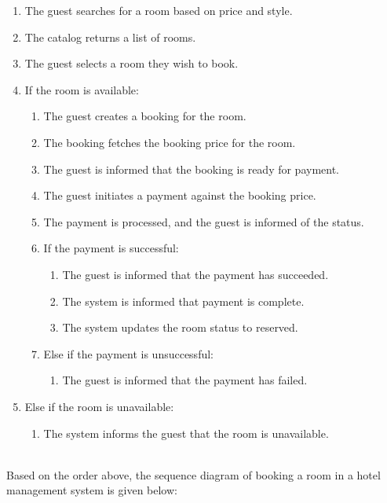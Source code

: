 \begin{enumerate}
\item
\protect{}\label{_birp3wlA1zLx5mtHHKYA}
The guest searches for a room based on price and style.
\item
\protect{}\label{pr79H-MAXxFd7xbPNf7dh}
The catalog returns a list of rooms.
\item
\protect{}\label{3yq8XOkIaVq2OBKUn5D1k}
The guest selects a room they wish to book.
\item
\protect{}\label{aESY_0fGiSzHgidnCYOhL}
If the room is available:

\begin{enumerate}
\item
The guest creates a booking for the room.
\item
The booking fetches the booking price for the room.
\item
The guest is informed that the booking is ready for payment.
\item
The guest initiates a payment against the booking price.
\item
The payment is processed, and the guest is informed of the status.
\item
If the payment is successful:

\begin{enumerate}
\item
The guest is informed that the payment has succeeded.
\item
The system is informed that payment is complete.
\item
The system updates the room status to reserved.
\end{enumerate}
\item
Else if the payment is unsuccessful:

\begin{enumerate}
\item
The guest is informed that the payment has failed.
\end{enumerate}
\end{enumerate}
\item
\protect{}\label{BE9GVOC0wL34n_11AaRsR}
Else if the room is unavailable:

\begin{enumerate}
\item
The system informs the guest that the room is unavailable.
\end{enumerate}
\end{enumerate}
\\
Based on the order above, the sequence diagram of booking a room in a hotel management system is given below:

